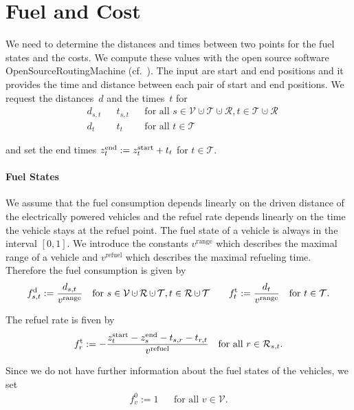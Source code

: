 \section{Fuel and Cost}
\label{sec:fuel_cost}

We need to determine the distances and times between two points for the fuel states and the costs. We compute these values with the open source software OpenSourceRoutingMachine (cf.~\cite{OSRM}). The input are start and end positions and it provides the time and distance between each pair of start and end positions. We request the distances~$d$ and the times~$t$ for
\begin{align*}
	& d_{s,t} && t_{s,t} && \text{for all } s\in\mathcal{V}\cupdot\mathcal{T}\cupdot\mathcal{R}, t\in\mathcal{T}\cupdot\mathcal{R} \\
	& d_t && t_t && \text{for all } t\in\mathcal{T}
\end{align*}

and set the end times ${z^{\operatorname{end}}_t := z^{\operatorname{start}}_t + t_t}$ for ${t\in\mathcal{T}}$.

\paragraph{Fuel States} \parfill

We assume that the fuel consumption depends linearly on the driven distance of the electrically powered vehicles and the refuel rate depends linearly on the time the vehicle stays at the refuel point. The fuel state of a vehicle is always in the interval $[0,1]$. We introduce the constants $v^{\operatorname{range}}$ which describes the maximal range of a vehicle and $v^{\operatorname{refuel}}$ which describes the maximal refueling time. Therefore the fuel consumption is given by
\begin{align*}
	\fd_{s,t} := \frac{d_{s,t}}{v^{\operatorname{range}}} && \text{for } s\in\mathcal{V}\cupdot\mathcal{R}\cupdot\mathcal{T}, t\in\mathcal{R}\cupdot\mathcal{T} && && \ft_t := \frac{d_t}{v^{\operatorname{range}}} && \text{for } t\in\mathcal{T}.
\end{align*}

The refuel rate is fiven by
\begin{align*}
	f^{\operatorname{t}}_r := -\frac{z^{\operatorname{start}}_t - z^{\operatorname{end}}_s - t_{s,r} - t_{r,t}}{v^{\operatorname{refuel}}} && \text{for all } r\in\mathcal{R}_{s,t}.
\end{align*}

Since we do not have further information about the fuel states of the vehicles, we set
\begin{align*}
	f^0_v := 1 && \text{for all } v\in\mathcal{V}.
\end{align*}


